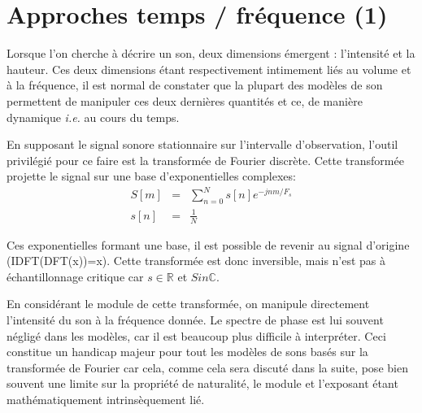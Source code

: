 \section{Approches temps / fréquence (1)}

Lorsque l'on cherche à décrire un son, deux dimensions émergent : l'intensité et la hauteur. Ces deux dimensions étant respectivement intimement liés au volume et à la fréquence, il est normal de constater que la plupart des modèles de son permettent de manipuler ces deux dernières quantités et ce, de manière dynamique \textit{i.e.} au cours du temps.

En supposant le signal sonore stationnaire sur l'intervalle d'observation, l'outil privilégié pour ce faire est la transformée de Fourier discrète. Cette transformée projette le signal sur une base d'exponentielles complexes:
\begin{eqnarray}
  S[m] &=& \sum_{n=0}^{N} s[n] e^{-jnm/F_s} \\
  s[n] &=&\frac{1}{N}
\end{eqnarray}

Ces exponentielles formant une base, il est possible de revenir au signal d'origine (IDFT(DFT(x))=x). Cette transformée est donc inversible, mais n'est pas à échantillonnage critique car $s\in \mathbb{R}$  et $S in \mathbb{C}$.

En considérant le module de cette transformée, on manipule directement l'intensité du son à la fréquence donnée. Le spectre de phase est lui souvent négligé dans les modèles, car il est beaucoup plus difficile à interpréter. Ceci constitue un handicap majeur pour tout les modèles de sons basés sur la transformée de Fourier car cela, comme cela sera discuté dans la suite, pose bien souvent une limite sur la propriété de naturalité, le module et l'exposant étant mathématiquement intrinsèquement lié.

